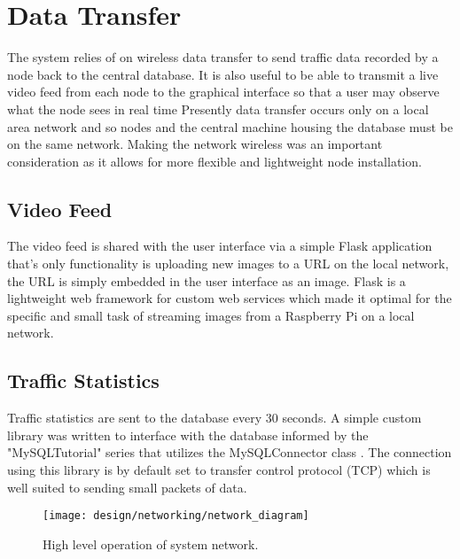 \section{Data Transfer}

The system relies of on wireless data transfer to send traffic data recorded by a node back to the central database. It is also useful to be able to transmit a live video feed from each node to the graphical interface so that a user may observe what the node sees in real time Presently data transfer occurs only on a local area network and so nodes and the central machine housing the database must be on the same network. Making the network wireless was an important consideration as it allows for more flexible and lightweight node installation.

\subsection{Video Feed}

The video feed is shared with the user interface via a simple Flask \cite{flask} application that's only functionality is uploading new images to a URL on the local network, the URL is simply embedded in the user interface as an image. Flask is a lightweight web framework for custom web services which made it optimal for the specific and small task of streaming images from a Raspberry Pi on a local network.


\subsection{Traffic Statistics}

Traffic statistics are sent to the database every 30 seconds. A simple custom library was written to interface with the database informed by the "MySQLTutorial" series \cite{mysqltutorial} that utilizes the MySQLConnector class \cite{mysqlconnector}. The connection using this library is by default set to transfer control protocol (TCP) which is well suited to sending small packets of data. 

\begin{figure}[H]
    \centering
    \centering\texttt{[image: design/networking/network\_diagram]}
    \caption{High level operation of system network.}
    \label{fig:network_diagram}
\end{figure}